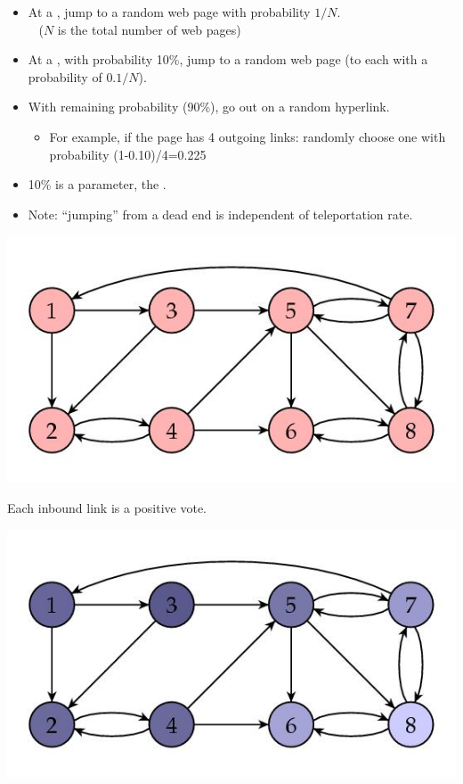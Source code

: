 \documentclass[a4paper,landscape,headrule,footrule,xetex]{foils}
\begin{document}
\begin{itemize}
\item At a , jump to a random web page with
  probability $1/N$.
\\ ~   \hfill ($N$ is the total number of web pages)
\item At a , with probability 10\%, jump to a
  random web page (to each with a probability of $0.1/N$).
\item With remaining probability (90\%), go out on a random
  hyperlink.
\begin{itemize}
 \item For example, if the page has 4 outgoing links:
   randomly choose one with probability (1-0.10)/4=0.225
\end{itemize}
\item 10\% is a parameter, the .
\item Note: ``jumping'' from a dead end is
independent of teleportation rate.
\end{itemize}

\begin{center}
\includegraphics[height=0.8\textheight]{../pics/goodnet.jpg}  
\end{center}
Each inbound link is a positive vote.


\begin{center}
\includegraphics[height=0.8\textheight]{../pics/goodnet.shaded.jpg}  
\end{center}
\end{document}
